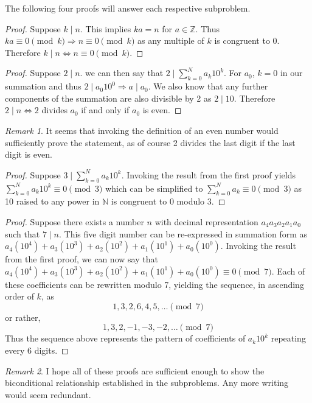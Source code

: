\documentclass[12pt]{article}
\numberwithin{problem}{section} %
\theoremstyle{remark}  %
\newtheorem*{remark}{Remark}
\newenvironment{answer}
    {\begin{adjustwidth}{0pt}{0pt}}
    {\end{adjustwidth}}
\begin{document}
    \begin{answer}
        The following four proofs will answer each respective subproblem.
        \begin{proof}
            Suppose $k \mid n$. This implies $ka=n$ for $a\in\mathbb{Z}$. Thus $ka\equiv 0 \pmod{k} \Rightarrow n \equiv 0 \pmod{k}$ as any multiple of $k$ is congruent to 0. Therefore $k \mid n \Leftrightarrow n\equiv 0 \pmod{k}$.
        \end{proof}
        \begin{proof}
            Suppose $2\mid n$. we can then say that $2\mid\sum_{k=0}^{N}a_k 10^k$. For $a_0$, $k=0$ in our summation and thus $2\mid a_0 10^0 \Rightarrow a \mid a_0$. We also know that any further components of the summation are also divisible by 2 as $2 \mid 10$. Therefore $2 \mid n \Leftrightarrow 2$ divides $a_0$ if and only if $a_0$ is even.
        \end{proof}
        \begin{remark}
            It seems that invoking the definition of an even number would sufficiently prove the statement, as of course 2 divides the last digit if the last digit is even.
        \end{remark}
        \begin{proof}
            Suppose $3 \mid \sum_{k=0}^{N}a_k 10^k$. Invoking the result from the first proof yields $\sum_{k=0}^{N}a_k 10^k \equiv 0 \pmod{3}$ which can be simplified to $\sum_{k=0}^{N}a_k \equiv 0 \pmod{3}$ as 10 raised to any power in $\mathbb{N}$ is congruent to 0 modulo 3.
        \end{proof}
        \begin{proof}
            Suppose there exists a number $n$ with decimal representation $a_4a_3a_2a_1a_0$ such that $7\mid n$. This five digit number can be re-expressed in summation form as $a_4(10^4) + a_3(10^3) + a_2(10^2) + a_1(10^1) + a_0(10^0)$. Invoking the result from the first proof, we can now say that $a_4(10^4) + a_3(10^3) + a_2(10^2) + a_1(10^1) + a_0(10^0) \equiv 0 \pmod{7}$. Each of these coefficients can be rewritten modulo 7, yielding the sequence, in ascending order of $k$, as $$
                1, 3, 2, 6, 4, 5, \dots \pmod{7}
            $$ or rather, $$
                1, 3, 2, -1, -3, -2, \dots \pmod{7}
            $$ Thus the sequence above represents the pattern of coefficients of $a_k10^k$ repeating every 6 digits.
        \end{proof}
        \begin{remark}
            I hope all of these proofs are sufficient enough to show the biconditional relationship established in the subproblems. Any more writing would seem redundant.
        \end{remark}
    \end{answer}
\end{document}
